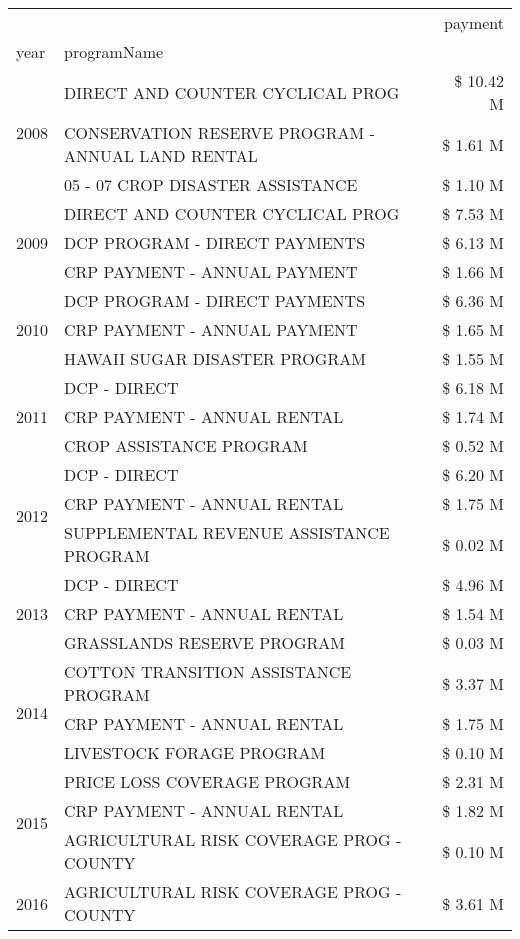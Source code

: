 \begin{tabular}{llr}
\toprule
 &  & payment \\
year & programName &  \\
\midrule
\multirow[t]{3}{*}{2008} & DIRECT AND COUNTER CYCLICAL PROG & \$ 10.42 M \\
 & CONSERVATION RESERVE PROGRAM - ANNUAL LAND RENTAL & \$ 1.61 M \\
 & 05 - 07 CROP DISASTER ASSISTANCE & \$ 1.10 M \\
\cline{1-3}
\multirow[t]{3}{*}{2009} & DIRECT AND COUNTER CYCLICAL PROG & \$ 7.53 M \\
 & DCP PROGRAM - DIRECT PAYMENTS & \$ 6.13 M \\
 & CRP PAYMENT - ANNUAL PAYMENT & \$ 1.66 M \\
\cline{1-3}
\multirow[t]{3}{*}{2010} & DCP PROGRAM - DIRECT PAYMENTS & \$ 6.36 M \\
 & CRP PAYMENT - ANNUAL PAYMENT & \$ 1.65 M \\
 & HAWAII SUGAR DISASTER PROGRAM & \$ 1.55 M \\
\cline{1-3}
\multirow[t]{3}{*}{2011} & DCP - DIRECT & \$ 6.18 M \\
 & CRP PAYMENT - ANNUAL RENTAL & \$ 1.74 M \\
 & CROP ASSISTANCE PROGRAM & \$ 0.52 M \\
\cline{1-3}
\multirow[t]{3}{*}{2012} & DCP - DIRECT & \$ 6.20 M \\
 & CRP PAYMENT - ANNUAL RENTAL & \$ 1.75 M \\
 & SUPPLEMENTAL REVENUE ASSISTANCE PROGRAM & \$ 0.02 M \\
\cline{1-3}
\multirow[t]{3}{*}{2013} & DCP - DIRECT & \$ 4.96 M \\
 & CRP PAYMENT - ANNUAL RENTAL & \$ 1.54 M \\
 & GRASSLANDS RESERVE PROGRAM & \$ 0.03 M \\
\cline{1-3}
\multirow[t]{3}{*}{2014} & COTTON TRANSITION ASSISTANCE PROGRAM & \$ 3.37 M \\
 & CRP PAYMENT - ANNUAL RENTAL & \$ 1.75 M \\
 & LIVESTOCK FORAGE PROGRAM & \$ 0.10 M \\
\cline{1-3}
\multirow[t]{3}{*}{2015} & PRICE LOSS COVERAGE PROGRAM & \$ 2.31 M \\
 & CRP PAYMENT - ANNUAL RENTAL & \$ 1.82 M \\
 & AGRICULTURAL RISK COVERAGE PROG - COUNTY & \$ 0.10 M \\
\cline{1-3}
\multirow[t]{3}{*}{2016} & AGRICULTURAL RISK COVERAGE PROG - COUNTY & \$ 3.61 M \\

\end{tabular}
